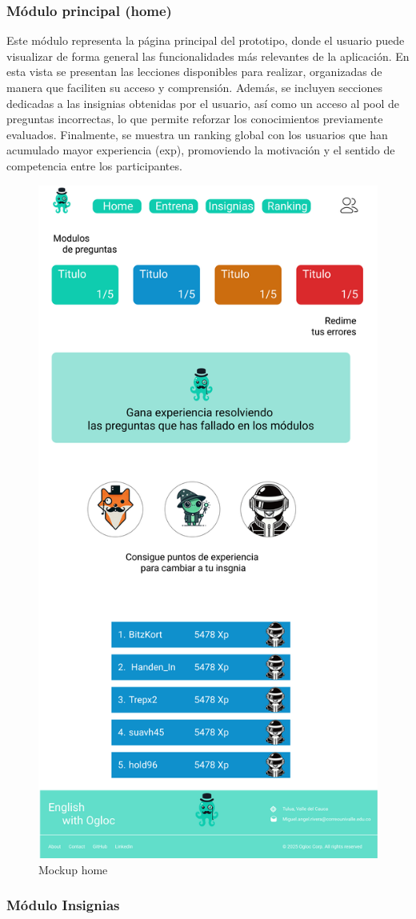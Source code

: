 \subsubsection{Módulo principal (home)}

Este módulo representa la página principal del prototipo, donde el usuario puede visualizar de forma general las funcionalidades más relevantes de la aplicación. En esta vista se presentan las lecciones disponibles para realizar, organizadas de manera que faciliten su acceso y comprensión. Además, se incluyen secciones dedicadas a las insignias obtenidas por el usuario, así como un acceso al pool de preguntas incorrectas, lo que permite reforzar los conocimientos previamente evaluados. Finalmente, se muestra un ranking global con los usuarios que han acumulado mayor experiencia (exp), promoviendo la motivación y el sentido de competencia entre los participantes.


\begin{figure}[H]
  \centering
  \includegraphics[width=0.5\linewidth]{Imagenes/Vista home.png}
  \caption{Mockup home}
  \label{fig:ER}
\end{figure}

\newpage
\subsubsection{Módulo Insignias}

